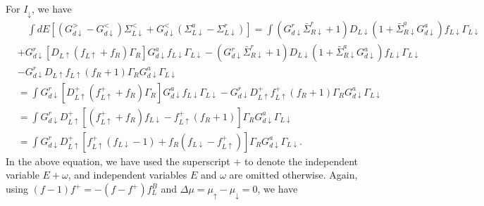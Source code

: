 \documentclass[aps,prb,superscriptaddress]{revtex4-2}
\begin{document}
For $I_\downarrow$, we have
\begin{equation}
\begin{split}
&\quad\int dE [(G_{d\downarrow}^>-G_{d\downarrow}^< )\Sigma_{L\downarrow}^< +G_{d\downarrow}^< (\Sigma_{L\downarrow}^a-\Sigma_{L\downarrow}^r)]= \int (G^r_{d\downarrow}{\bar \Sigma}_{R\downarrow}^r+1) D_{L\downarrow} (1+{\bar \Sigma}_{R\downarrow}^a G^a_{d\downarrow})f_{L\downarrow}\Gamma_{L\downarrow} \\
&+ G^r_{d\downarrow}  [D_{L\uparrow}(f_{L\uparrow}+f_{R})\Gamma_{R}] G^a_{d\downarrow} f_{L\downarrow}\Gamma_{L\downarrow} - (G^r_{d\downarrow}{\bar \Sigma}_{R\downarrow}^r+1) D_{L\downarrow} (1+{\bar \Sigma}_{R\downarrow}^a G^a_{d\downarrow}) f_{L\downarrow}\Gamma_{L\downarrow} \\
&- G^r_{d\downarrow}  D_{L\uparrow}f_{L\uparrow}(f_R+1)\Gamma_R G^a_{d\downarrow} \Gamma_{L\downarrow} \\
&= \int G^r_{d\downarrow}  [D_{L\uparrow}^{+}(f_{L\uparrow}^{+}+f_{R})\Gamma_{R}] G^a_{d\downarrow} f_{L\downarrow}\Gamma_{L\downarrow} - G^r_{d\downarrow}  D_{L\uparrow}^{+}f_{L\uparrow}^{+}(f_R+1)\Gamma_R G^a_{d\downarrow} \Gamma_{L\downarrow} \\
&= \int G^r_{d\downarrow} D_{L\uparrow}^{+}[(f_{L\uparrow}^{+}+f_{R})f_{L\downarrow} - f_{L\uparrow}^{+}(f_R+1)]\Gamma_{R} G^a_{d\downarrow} \Gamma_{L\downarrow} \\
&= \int G^r_{d\downarrow} D_{L\uparrow}^{+}[f_{L\uparrow}^{+}(f_{L\downarrow}-1)+f_{R}(f_{L\downarrow}- f_{L\uparrow}^{+})]\Gamma_{R} G^a_{d\downarrow} \Gamma_{L\downarrow}.
\end{split}
\end{equation}
In the above equation, we have used the superscript $+$ to denote the independent variable $E+\omega$, and independent variables $E$ and $\omega$ are omitted otherwise. Again, using $(f-1)f^+= -(f-f^+)f^B_L$ and $\Delta \mu=\mu_\uparrow-\mu_\downarrow=0$, we have
\end{document}
